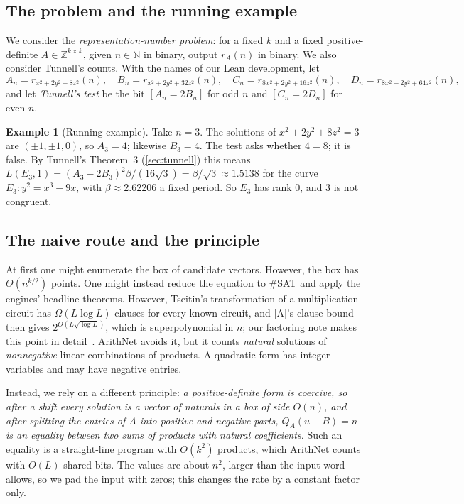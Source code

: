 \documentclass[10pt]{amsart}
\theoremstyle{plain}
\theoremstyle{definition}
\newtheorem{example}[theorem]{Example}
\theoremstyle{remark}
\numberwithin{equation}{section}
\newcommand{\A}{\textup{[A]}}
\newcommand{\Z}{\mathbb{Z}}
\newcommand{\N}{\mathbb{N}}
\begin{document}
\subsection{The problem and the running example}
We consider the \emph{representation-number problem}: for a fixed $k$ and a fixed positive-definite
$A\in\Z^{k\times k}$, given $n\in\N$ in binary, output $r_A(n)$ in binary. We also consider Tunnell's
counts. With the names of our Lean development, let
\[
  A_n=r_{x^2+2y^2+8z^2}(n),\quad B_n=r_{x^2+2y^2+32z^2}(n),\quad
  C_n=r_{8x^2+2y^2+16z^2}(n),\quad D_n=r_{8x^2+2y^2+64z^2}(n),
\]
and let \emph{Tunnell's test} be the bit $[A_n=2B_n]$ for odd $n$ and $[C_n=2D_n]$ for even $n$.

\begin{example}[Running example]\label{ex:three}
Take $n=3$. The solutions of $x^2+2y^2+8z^2=3$ are $(\pm1,\pm1,0)$, so $A_3=4$; likewise $B_3=4$. The test
asks whether $4=8$; it is false. By Tunnell's Theorem~3 (\cref{sec:tunnell}) this means
$L(E_3,1)=(A_3-2B_3)^2\beta/(16\sqrt3)=\beta/\sqrt3\approx1.5138$ for the curve $E_3:y^2=x^3-9x$, with
$\beta\approx2.62206$ a fixed period. So $E_3$ has rank $0$, and $3$ is not congruent.
\end{example}

\subsection{The naive route and the principle}
At first one might enumerate the box of candidate vectors. However, the box has $\Theta(n^{k/2})$ points.
One might instead reduce the equation to $\#$SAT and apply the engines' headline theorems. However,
Tseitin's transformation of a multiplication circuit has $\Omega(L\log L)$ clauses for every known circuit,
and \A's clause bound then gives $2^{O(L\sqrt{\log L})}$, which is superpolynomial in $n$; our factoring
note makes this point in detail~\cite[\S1]{TulFac26}. ArithNet avoids it, but it counts \emph{natural}
solutions of \emph{nonnegative} linear combinations of products. A quadratic form has integer variables
and may have negative entries.

Instead, we rely on a different principle: \emph{a positive-definite form is coercive, so after a shift every
solution is a vector of naturals in a box of side $O(n)$, and after splitting the entries of $A$ into
positive and negative parts, $Q_A(u-B)=n$ is an equality between two sums of products with natural
coefficients.} Such an equality is a straight-line program with $O(k^2)$ products, which ArithNet counts
with $O(L)$ shared bits. The values are about $n^2$, larger than the input word allows, so we pad the
input with zeros; this changes the rate by a constant factor only.
\end{document}
